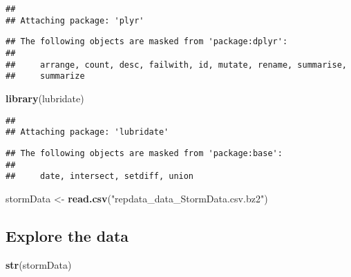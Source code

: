 \documentclass[
]{article}
\newenvironment{Shaded}{\begin{snugshade}}{\end{snugshade}}
\newcommand{\KeywordTok}[1]{\textcolor[rgb]{0.13,0.29,0.53}{\textbf{#1}}}
\newcommand{\NormalTok}[1]{#1}
\newcommand{\StringTok}[1]{\textcolor[rgb]{0.31,0.60,0.02}{#1}}
\begin{document}
\begin{verbatim}
## 
## Attaching package: 'plyr'
\end{verbatim}

\begin{verbatim}
## The following objects are masked from 'package:dplyr':
## 
##     arrange, count, desc, failwith, id, mutate, rename, summarise,
##     summarize
\end{verbatim}

\begin{Shaded}
\begin{Highlighting}[]
\KeywordTok{library}\NormalTok{(lubridate)}
\end{Highlighting}
\end{Shaded}

\begin{verbatim}
## 
## Attaching package: 'lubridate'
\end{verbatim}

\begin{verbatim}
## The following objects are masked from 'package:base':
## 
##     date, intersect, setdiff, union
\end{verbatim}

\begin{Shaded}
\begin{Highlighting}[]
\NormalTok{stormData <-}\StringTok{ }\KeywordTok{read.csv}\NormalTok{(}\StringTok{"repdata_data_StormData.csv.bz2"}\NormalTok{)}
\end{Highlighting}
\end{Shaded}

\hypertarget{explore-the-data}{%
\subsection{Explore the data}\label{explore-the-data}}

\begin{Shaded}
\begin{Highlighting}[]
\KeywordTok{str}\NormalTok{(stormData)}
\end{Highlighting}
\end{Shaded}
\end{document}
